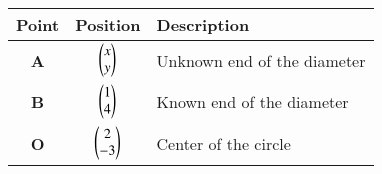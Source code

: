 \begin{tabular}[12pt]{|c|c|l|}
    \hline
	\textbf{Point} & \textbf{Position} & \textbf{Description}\\ 
    \hline
	\textbf{A} & $\begin{pmatrix}x \\ y\end{pmatrix}$ & Unknown end of the diameter \\
    \hline 
	\textbf{B} & $\begin{pmatrix}1 \\ 4\end{pmatrix}$ & Known end of the diameter \\
    \hline
	\textbf{O} & $\begin{pmatrix}2 \\ -3\end{pmatrix}$ & Center of the circle \\
    \hline   
    \end{tabular}
